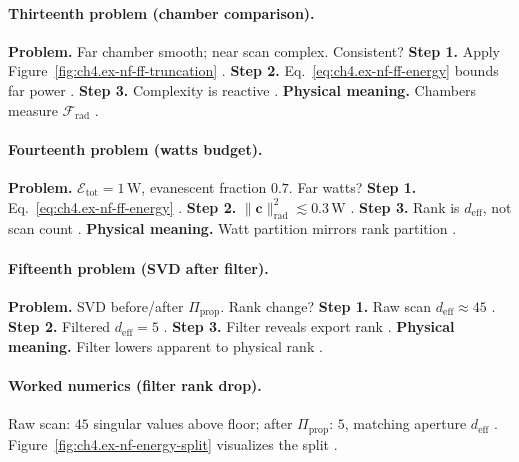 \paragraph{Thirteenth problem (chamber comparison).}
\textbf{Problem.} Far chamber smooth; near scan complex. Consistent?
\textbf{Step 1.} Apply Figure~\ref{fig:ch4.ex-nf-ff-truncation} \cite{stratton1941,harrington2001,hansen1988}.
\textbf{Step 2.} Eq.~\eqref{eq:ch4.ex-nf-ff-energy} bounds far power \cite{jackson1999,devaney2004}.
\textbf{Step 3.} Complexity is reactive \cite{harrington2001,stratton1941,hansen1988}.
\textbf{Physical meaning.} Chambers measure \(\mathcal{F}_{\mathrm{rad}}\) \cite{devaney2004,jackson1999}.

\paragraph{Fourteenth problem (watts budget).}
\textbf{Problem.} \(\mathcal{E}_{\mathrm{tot}}=1\,\mathrm{W}\), evanescent fraction \(0.7\). Far watts?
\textbf{Step 1.} Eq.~\eqref{eq:ch4.ex-nf-ff-energy} \cite{stratton1941,jackson1999,harrington2001,hansen1988}.
\textbf{Step 2.} \(\|\mathbf{c}\|_{\mathrm{rad}}^{2}\lesssim0.3\,\mathrm{W}\) \cite{devaney2004,harrington2001}.
\textbf{Step 3.} Rank is \(d_{\mathrm{eff}}\), not scan count \cite{stratton1941,jackson1999,hansen1988}.
\textbf{Physical meaning.} Watt partition mirrors rank partition \cite{harrington2001,devaney2004}.

\paragraph{Fifteenth problem (SVD after filter).}
\textbf{Problem.} SVD before/after \(\Pi_{\mathrm{prop}}\). Rank change?
\textbf{Step 1.} Raw scan \(d_{\mathrm{eff}}\approx45\) \cite{harrington2001,hansen1988,stratton1941}.
\textbf{Step 2.} Filtered \(d_{\mathrm{eff}}=5\) \cite{devaney2004,jackson1999}.
\textbf{Step 3.} Filter reveals export rank \cite{harrington2001,stratton1941,hansen1988,devaney2004}.
\textbf{Physical meaning.} Filter lowers apparent to physical rank \cite{jackson1999,stratton1941}.

\paragraph{Worked numerics (filter rank drop).}
Raw scan: \(45\) singular values above floor; after \(\Pi_{\mathrm{prop}}\): \(5\), matching aperture \(d_{\mathrm{eff}}\)
\cite{harrington2001,stratton1941,hansen1988,devaney2004,jackson1999}. Figure~\ref{fig:ch4.ex-nf-energy-split} visualizes the split
\cite{harrington2001,stratton1941,hansen1988,devaney2004}.

